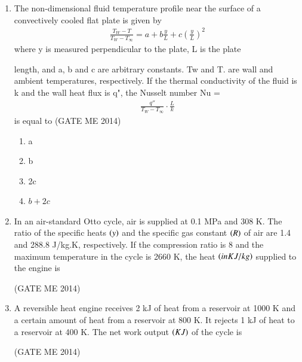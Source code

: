 \documentclass[journal]{IEEEtran}
\numberwithin{equation}{enumi}
\numberwithin{figure}{enumi}
\begin{document}
\begin{enumerate}
\item The non-dimensional fluid temperature profile near the surface of a convectively cooled flat plate is given by \begin{align}
\frac{T_W - T}{T_W - T_\infty} = a + b \frac{y}{L} + c \left( \frac{y}{L} \right)^2
\end{align}
where y is measured perpendicular to the plate, L is the plate

length, and a, b and c are arbitrary constants. Tw and T. are wall and ambient temperatures,
respectively. If the thermal conductivity of the fluid is k and the wall heat flux is q", the Nusselt number Nu =\begin{align}
\frac{q''}{T_W - T_\infty} \cdot \frac{L}{k}
\end{align}
is equal to
 \hfill{(GATE ME 2014)}
\begin{multicols}{4}
    \begin{enumerate}
        \item a
        \item b
        \item 2c
        \item $b+2c$
    \end{enumerate}
\end{multicols}


\item In an air-standard Otto cycle, air is supplied at 0.1 MPa and 308 K. The ratio of the specific heats
$\left(y\right)$ and the specific gas constant $\left(R\right)$ of air are 1.4 and 288.8 J/kg.K, respectively. If the compression
ratio is 8 and the maximum temperature in the cycle is 2660 K, the heat $\left(in KJ/kg\right)$ supplied to the engine is

 \hfill{(GATE ME 2014)}
 
\item A reversible heat engine receives 2 kJ of heat from a reservoir at 1000 K and a certain amount of
heat from a reservoir at 800 K. It rejects 1 kJ of heat to a reservoir at 400 K. The net work output
$\left(KJ\right)$ of the cycle is

 \hfill{(GATE ME 2014)}
 

\end{enumerate}
\end{document}
